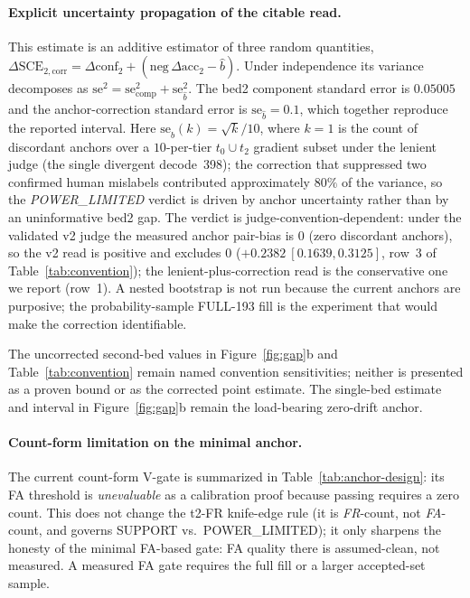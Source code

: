 \documentclass{article}
\begin{document}
\paragraph{Explicit uncertainty propagation of the citable read.}
This estimate is an additive estimator of three random quantities,
$\Delta\mathrm{SCE}_{2,\mathrm{corr}}=\Delta\mathrm{conf}_2+(\mathrm{neg}\,\Delta\mathrm{acc}_2-\hat b)$.
Under independence its variance decomposes as
$\mathrm{se}^2=\mathrm{se}^2_{\mathrm{comp}}+\mathrm{se}^2_{\hat b}$.  The bed2
component standard error is $0.05005$ and the anchor-correction standard error is
$\mathrm{se}_{\hat b}{=}0.1$, which together reproduce the reported interval.  Here
$\mathrm{se}_{\hat b}(k)=\sqrt{k}/10$, where $k{=}1$ is the count of discordant
anchors over a $10$-per-tier $t_0\cup t_2$ gradient subset under the lenient judge
(the single divergent decode~398); the correction that suppressed two confirmed
human mislabels contributed approximately $80\%$ of the variance, so the
\emph{POWER\_LIMITED} verdict is driven by anchor uncertainty rather than by an
uninformative bed2 gap.  The verdict is judge-convention-dependent: under the
validated v2 judge the measured anchor pair-bias is $0$ (zero discordant anchors),
so the v2 read is positive and excludes $0$ ($+0.2382\ [0.1639,0.3125]$,
row~3 of Table~\ref{tab:convention}); the lenient-plus-correction read is the
conservative one we report (row~1).  A nested bootstrap is not run because the current
anchors are purposive; the probability-sample FULL-193 fill is the experiment that
would make the correction identifiable.

The uncorrected second-bed values in Figure~\ref{fig:gap}b and
Table~\ref{tab:convention} remain named convention sensitivities; neither is
presented as a proven bound or as the corrected point estimate.  The single-bed
estimate and interval in Figure~\ref{fig:gap}b remain the load-bearing zero-drift
anchor.

\paragraph{Count-form limitation on the minimal anchor.}
The current count-form V-gate is summarized in
Table~\ref{tab:anchor-design}: its FA threshold is \emph{unevaluable} as a
calibration proof because passing requires a zero count.  This does not change the
t2-FR knife-edge rule (it is
\emph{FR}-count, not \emph{FA}-count, and governs SUPPORT vs.\ POWER\_LIMITED); it
only sharpens the honesty of the minimal FA-based gate: FA quality there is
assumed-clean, not measured.  A measured FA gate requires the full fill or a larger
accepted-set sample.
\end{document}
